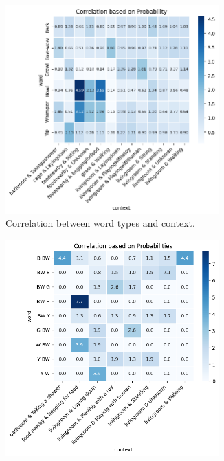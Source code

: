 \begin{figure}[th]
\begin{subfigure}[t]{0.49\textwidth}
	\centering
	\includegraphics[width=0.9\textwidth]{images/one_sound_context.png}
	\caption{Correlation between word types and context.}
\label{fig:one_sound_context}
\end{subfigure}
\begin{subfigure}[t]{0.49\textwidth}
	\centering
	\includegraphics[width=0.9\textwidth]{images/sound_context_distri.png}

\end{subfigure}
\end{figure}
